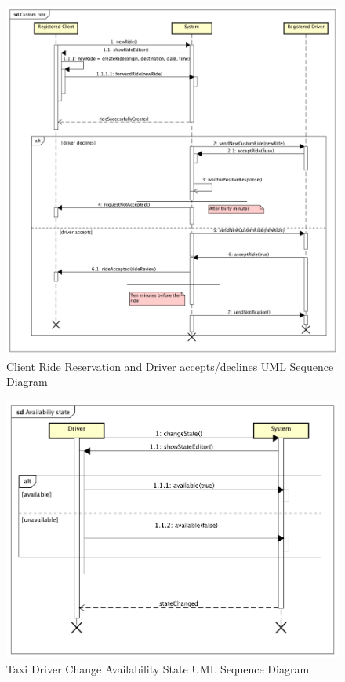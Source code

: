\documentclass[a4paper]{article}
\begin{document}
\begin{enumerate}[label=\bfseries G\arabic*:]
\begin{figure}[H]
\includegraphics[width=\sequenceWidth]{Sequence-Client-RideReservation}
\centering
\caption{Client Ride Reservation and Driver accepts/declines UML Sequence Diagram}
\label{fig:sequenceclientridereservation}
\end{figure}

\begin{figure}[H]
\includegraphics[width=\sequenceWidth]{Sequence-TaxiDriver-ChangeAvailabilityState}
\centering
\caption{Taxi Driver Change Availability State UML Sequence Diagram}
\label{fig:sequencetaxidriverchangestate}
\end{figure}


\end{enumerate}
\end{document}
